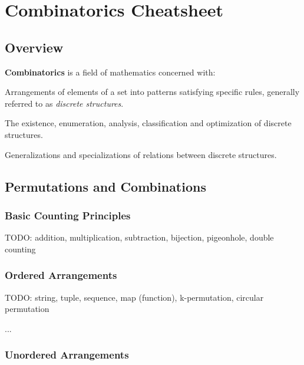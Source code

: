 \documentclass[a4paper,10pt]{article}
\begin{document}

\setcounter{section}{5}
\section{Combinatorics Cheatsheet}

\subsection{Overview}

\begin{terms}
    \item \textbf{Combinatorics} is a field of mathematics concerned with:
    \begin{terms}
        \item Arrangements of elements of a set into patterns satisfying specific rules, generally referred to as \emph{discrete structures}.
        \item The existence, enumeration, analysis, classification and optimization of discrete structures.
        \item Generalizations and specializations of relations between discrete structures.
    \end{terms}
\end{terms}

\subsection{Permutations and Combinations}

\subsubsection{Basic Counting Principles}

\noindent TODO: addition, multiplication, subtraction, bijection, pigeonhole, double counting

\subsubsection{Ordered Arrangements}

\noindent TODO: string, tuple, sequence, map (function), k-permutation, circular permutation

\begin{terms}
    \item ...
\end{terms}

\subsubsection{Unordered Arrangements}
\end{document}
